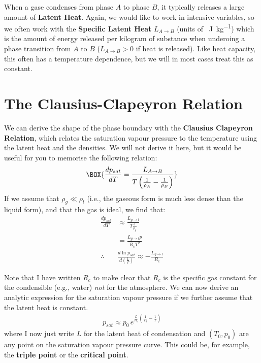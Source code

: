 When a gase condenses from phase $A$ to phase $B$, it typically releases a large amount of \textbf{Latent Heat}. Again, we would like to work in intensive variables, so we often work with the \textbf{Specific Latent Heat} $L_{A\to B}$ (units of \qty{}{\joule\per\kilogram}) which is the amount of energy released per kilogram of substance when underoing a phase transition from $A$ to $B$ ($L_{A\to B}>0$ if heat is released). Like heat capacity, this often has a temperature dependence, but we will in most cases treat this as constant.

\section{The Clausius-Clapeyron Relation}

We can derive the shape of the phase boundary with the \textbf{Clausius Clapeyron Relation}, which relates the saturation vapour pressure to the temperature using the latent heat and the densities. We will not derive it here, but it would be useful for you to memorise the following relation:
\begin{align}\label{Clausius Clapeyron}
    \BOX{
        \frac{dp_{sat}}{dT}=\frac{L_{A\to B}}{T\left(\frac{1}{\rho_A}-\frac{1}{\rho_B}\right)}
        }
\end{align}
If we assume that $\rho_g\ll\rho_l$ (i.e., the gaseous form is much less dense than the liquid form), and that the gas is ideal, we find that:
\begin{align}
    \frac{d p_{sat}}{dT}&\approx\frac{L_{g\to l}}{T \frac{1}{\rho_g}}\nonumber\\
    & = \frac{L_{g \to l} p}{R_cT^2}\nonumber\\
    \therefore \,\,\,& \boxed{\frac{d \ln p_{sat}}{d \left( \frac{1}{T} \right)} \approx -\frac{L_{g\to l}}{R_c}}\label{Clausius Clapeyron Simplified}
\end{align}

Note that I have written $R_c$ to make clear that $R_c$ is the specific gas constant for the condensible (e.g., water) \textit{not} for the atmosphere. We can now derive an analytic expression for the saturation vapour pressure if we further assume that the latent heat is constant. 
\begin{align}
    \boxed{
        p_{sat}\approx p_0 \,e^{\frac{L}{R_c}\left( \frac{1}{T_0}-\frac{1}{T} \right)}
    }
    \label{Sat Vap Pressure}
\end{align}
where I now just write $L$ for the latent heat of condensation and $(T_0,p_0)$ are any point on the saturation vapour pressure curve. This could be, for example, the \textbf{triple point} or the \textbf{critical point}.

